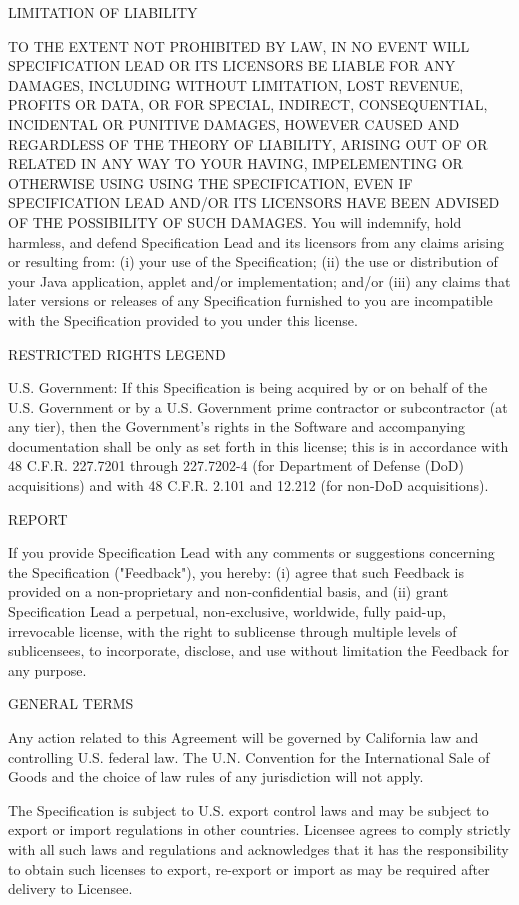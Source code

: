 LIMITATION OF LIABILITY 

TO THE EXTENT NOT PROHIBITED BY LAW, IN NO EVENT WILL SPECIFICATION LEAD OR ITS LICENSORS BE LIABLE FOR ANY DAMAGES, INCLUDING WITHOUT LIMITATION, LOST REVENUE, PROFITS OR DATA, OR FOR SPECIAL, INDIRECT, CONSEQUENTIAL, INCIDENTAL OR PUNITIVE DAMAGES, HOWEVER CAUSED AND REGARDLESS OF THE THEORY OF LIABILITY, ARISING OUT OF OR RELATED IN ANY WAY TO YOUR HAVING, IMPELEMENTING OR OTHERWISE USING USING  THE SPECIFICATION, EVEN IF SPECIFICATION LEAD AND/OR ITS LICENSORS HAVE BEEN ADVISED OF THE POSSIBILITY OF SUCH DAMAGES. 
You will indemnify, hold harmless, and defend Specification Lead and its licensors from any claims arising or resulting from: (i) your use of the Specification; (ii) the use or distribution of your Java application, applet and/or implementation; and/or (iii) any claims that later versions or releases of any Specification furnished to you are incompatible with the Specification provided to you under this license. 

RESTRICTED RIGHTS LEGEND 

U.S. Government: If this Specification is being acquired by or on behalf of the U.S. Government or by a U.S. Government prime contractor or subcontractor (at any tier), then the Government's rights in the Software and accompanying documentation shall be only as set forth in this license; this is in accordance with 48 C.F.R. 227.7201 through 227.7202-4 (for Department of Defense (DoD) acquisitions) and with 48 C.F.R. 2.101 and 12.212 (for non-DoD acquisitions). 

REPORT

If you provide Specification Lead with any comments or suggestions concerning the Specification ("Feedback"), you hereby: (i) agree that such Feedback is provided on a non-proprietary and non-confidential basis, and (ii) grant Specification Lead a perpetual, non-exclusive, worldwide, fully paid-up, irrevocable license, with the right to sublicense through multiple levels of sublicensees, to incorporate, disclose, and use without limitation the Feedback for any purpose.

GENERAL TERMS

Any action related to this Agreement will be governed by California law and controlling U.S. federal law. The U.N. Convention for the International Sale of Goods and the choice of law rules of any jurisdiction will not apply.

The Specification is subject to U.S. export control laws and may be subject to export or import regulations in other countries. Licensee agrees to comply strictly with all such laws and regulations and acknowledges that it has the responsibility to obtain such licenses to export, re-export or import as may be required after delivery to Licensee.

